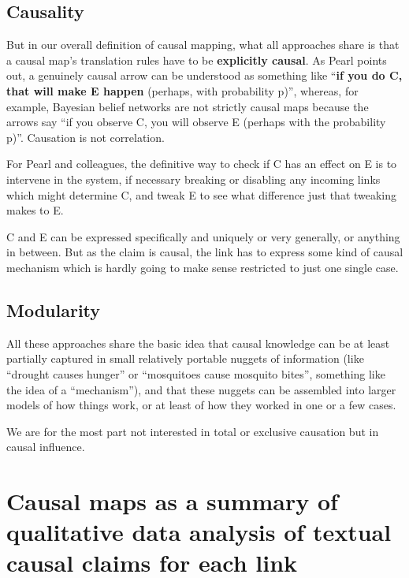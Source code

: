 \documentclass[
]{book}
\begin{document}
\hypertarget{causality}{%
\subsection{Causality}\label{causality}}

But in our overall definition of causal mapping, what all approaches share is that a causal map's translation rules have to be \textbf{explicitly causal}. As Pearl points out, a genuinely causal arrow can be understood as something like ``\textbf{if you do C, that will make E happen} (perhaps, with probability p)'', whereas, for example, Bayesian belief networks are not strictly causal maps because the arrows say ``if you observe C, you will observe E (perhaps with the probability p)''. Causation is not correlation.

For Pearl and colleagues, the definitive way to check if C has an effect on E is to intervene in the system, if necessary breaking or disabling any incoming links which might determine C, and tweak E to see what difference just that tweaking makes to E.

C and E can be expressed specifically and uniquely or very generally, or anything in between. But as the claim is causal, the link has to express some kind of causal mechanism which is hardly going to make sense restricted to just one single case.

\hypertarget{modularity}{%
\subsection{Modularity}\label{modularity}}

All these approaches share the basic idea that causal knowledge can be at least partially captured in small relatively portable nuggets of information (like ``drought causes hunger'' or ``mosquitoes cause mosquito bites'', something like the idea of a ``mechanism''), and that these nuggets can be assembled into larger models of how things work, or at least of how they worked in one or a few cases.

We are for the most part not interested in total or exclusive causation but in causal influence.

\hypertarget{causal-maps-as-a-summary-of-qualitative-data-analysis-of-textual-causal-claims-for-each-link}{%
\section{Causal maps as a summary of qualitative data analysis of textual causal claims for each link}\label{causal-maps-as-a-summary-of-qualitative-data-analysis-of-textual-causal-claims-for-each-link}}
\end{document}
